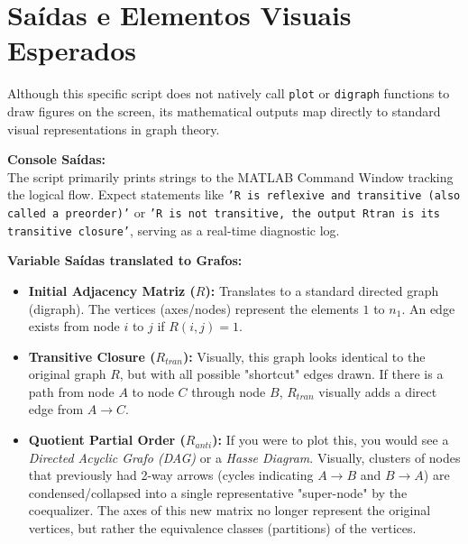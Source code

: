 \section{Saídas e Elementos Visuais Esperados}

Although this specific script does not natively call \texttt{plot} or \texttt{digraph} functions to draw figures on the screen, its mathematical outputs map directly to standard visual representations in graph theory.

\textbf{Console Saídas:} \\
The script primarily prints strings to the MATLAB Command Window tracking the logical flow. Expect statements like \texttt{'R is reflexive and transitive (also called a preorder)'} or \texttt{'R is not transitive, the output Rtran is its transitive closure'}, serving as a real-time diagnostic log.

\textbf{Variable Saídas translated to Grafos:}
\begin{itemize}
    \item \textbf{Initial Adjacency Matriz ($R$):} Translates to a standard directed graph (digraph). The vertices (axes/nodes) represent the elements $1$ to $n_1$. An edge exists from node $i$ to $j$ if $R(i,j) = 1$.
    \item \textbf{Transitive Closure ($R_{tran}$):} Visually, this graph looks identical to the original graph $R$, but with all possible "shortcut" edges drawn. If there is a path from node $A$ to node $C$ through node $B$, $R_{tran}$ visually adds a direct edge from $A \to C$.
    \item \textbf{Quotient Partial Order ($R_{anti}$):} If you were to plot this, you would see a \textit{Directed Acyclic Grafo (DAG)} or a \textit{Hasse Diagram}. Visually, clusters of nodes that previously had 2-way arrows (cycles indicating $A \to B$ and $B \to A$) are condensed/collapsed into a single representative "super-node" by the coequalizer. The axes of this new matrix no longer represent the original vertices, but rather the equivalence classes (partitions) of the vertices.
\end{itemize}

\vspace{1em}


